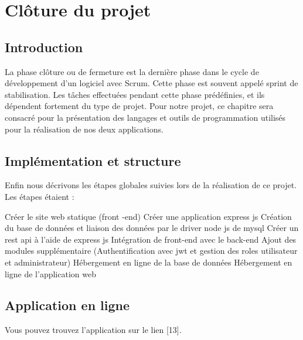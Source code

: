 \chapter{ Cl\^{o}ture du projet }

\section{Introduction}

La phase cl\^{o}ture ou de fermeture est la derni\`{e}re phase dans le cycle de d\'{e}veloppement d'un
logiciel avec Scrum. Cette phase est souvent appel\'{e} sprint de stabilisation. Les t\^{a}ches
effectu\'{e}es pendant cette phase pr\'{e}d\'{e}finies, et ils d\'{e}pendent fortement du type de projet.
Pour notre projet, ce chapitre sera consacr\'{e} pour la pr\'{e}sentation des langages et outils de
programmation utilis\'{e}s pour la r\'{e}alisation de nos deux applications.



\section{Impl\'{e}mentation et structure}
Enfin nous d\'{e}crivons les \'{e}tapes globales suivies lors de la r\'{e}alisation de ce projet.
Les \'{e}tapes \'{e}taient :
\bigskip


\textbullet{}  Cr\'{e}er le site web statique (front -end)  \newline
\textbullet{} Cr\'{e}er une application express js  \newline
\textbullet{}  Cr\'{e}ation du base de donn\'{e}es et liaison des donn\'{e}es par le driver node js  de mysql \newline
\textbullet{}Cr\'{e}er un rest api \`{a} l'aide de express js  \newline
\textbullet{}Int\'{e}gration de front-end avec le back-end  \newline
\textbullet{}Ajout des modules suppl\'{e}mentaire (Authentification avec jwt et gestion des roles utilisateur et administrateur)  \newline
\textbullet{}  H\'{e}bergement en ligne de la base de donn\'{e}es \newline
\textbullet{} H\'{e}bergement en ligne de l'application web  \newline




\section{Application en ligne}
Vous pouvez trouvez l'application sur le lien [13].


